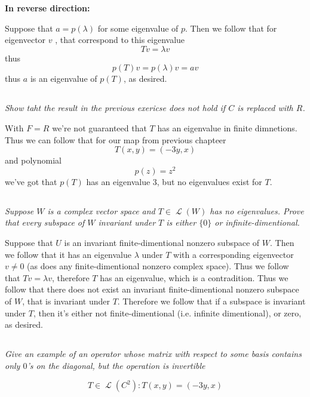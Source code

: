 \documentclass[11pt,oneside,titlepage]{book}
\DeclareMathOperator \map {\mathcal {L}}
\begin{document}
\textbf{In reverse direction: }

Suppose that $a = p(\lambda)$ for some eigenvalue of $p$. Then we follow that
for eigenvector $v$ , that correspond to this eigenvalue 
$$Tv = \lambda v$$
thus
$$p(T)v = p(\lambda)v = av$$
thus $a$ is an eigenvalue of $p(T)$, as desired.


\subsection{}

\textit{Show taht the result in the previous exericse does not hold if $C$ is replaced with $R$.}

With $F = R$ we're not guaranteed that $T$ has an eigenvalue in finite dimnetions. Thus we
can follow that for our map from previous chapteer
$$T(x, y) = (-3y, x)$$
and polynomial
$$p(z) = z^2$$
we've got that $p(T)$ has an eigenvalue 3, but no eigenvalues exist for $T$.


\subsection{}

\textit{Suppose $W$ is a complex vector space and $T \in \map(W)$ has no eigenvalues. Prove that
  every subspace of $W$ invariant under $T$ is either $\{0\}$ or
  infinite-dimentional.}

Suppose that $U$ is an invariant finite-dimentional nonzero subspace of $W$. Then we follow that
it has an eigenvalue $\lambda$ under $T$ with a corresponding eigenvector $v \neq 0$
(as does any finite-dimentional nonzero complex space).
Thus we follow that $Tv = \lambda v$, therefore
$T$ has an eigenvalue, which is a contradition. Thus we follow that there does not exist an
invariant finite-dimentional nonzero subspace of $W$, that is invariant under $T$. Therefore
we follow that if a subspace is invariant under $T$, then it's either not finite-dimentional
(i.e. infinite dimentional), or zero, as desired.

\subsection{}

\textit{Give an example of an operator whose matrix with respect to some basis contains only $0$'s
on the diagonal, but the operation is invertible}

$$T \in \map(C^2): T(x, y) = (-3y, x)$$
\end{document}
